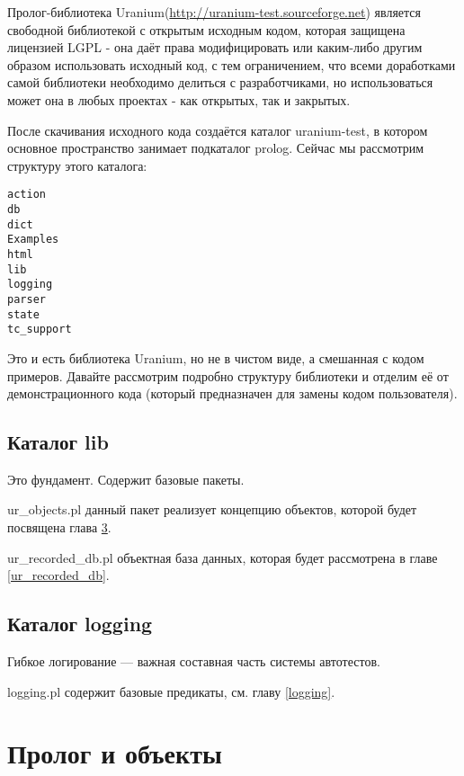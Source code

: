 \documentclass[a4paper]{book}
\def\ur{Uranium}
\begin{document}
Пролог-библиотека \ur (\url{http://uranium-test.sourceforge.net})
является свободной библиотекой с открытым исходным кодом, которая
защищена лицензией LGPL - она даёт права модифицировать или
каким-либо другим образом использовать исходный код, с тем
ограничением, что всеми доработками самой библиотеки необходимо
делиться с разработчиками, но использоваться может она в любых
проектах - как открытых, так и закрытых.

После скачивания исходного кода создаётся каталог uranium-test, в
котором основное пространство занимает подкаталог prolog. Сейчас
мы рассмотрим структуру этого каталога:

\begin{verbatim}
action
db
dict
Examples
html
lib
logging
parser
state
tc_support
\end{verbatim}

Это и есть библиотека \ur, но не в чистом виде, а смешанная с
кодом примеров. Давайте рассмотрим подробно структуру библиотеки
и отделим её от демонстрационного кода (который предназначен для
замены кодом пользователя).

\section{Каталог lib}

Это фундамент. Содержит базовые пакеты.

\begin{description} 
\item ur\_objects.pl данный пакет реализует концепцию
  объектов, которой будет посвящена глава \ref{ur_objects}.
\item ur\_recorded\_db.pl объектная база данных, которая
  будет рассмотрена в главе \ref{ur_recorded_db}.
\end{description}

\section{Каталог logging}

Гибкое логирование --- важная составная часть системы автотестов.

\begin{description}
\item logging.pl содержит базовые предикаты, см. главу
  \ref{logging}.
\end{description}

\chapter{Пролог и объекты}
\label{ur_objects}
\end{document}
